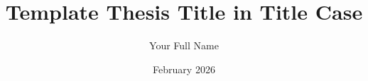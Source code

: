 
\usepackage{booktabs}        %
\usepackage{tabularray}      %
\usepackage{longtable}       %

\usepackage{mathtools}       %
\usepackage{pifont}          %
\usepackage{siunitx}         %

\usepackage{float}           %
\usepackage{stfloats}        %
\usepackage{subcaption}      %
\usepackage{rotating}        %

\usepackage{algorithm}       %
\usepackage[noend]{algpseudocode} %

\usepackage{lipsum}            %
\usepackage{enumitem}          %
\usepackage{relsize}           %
\usepackage[version=4]{mhchem} %
\usepackage{verbatim}          %
\usepackage{afterpage}         %

\title{Template Thesis Title in Title Case}
\author{Your Full Name}
\date{February 2026}

